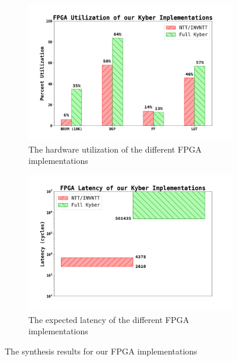 \begin{figure}[H]
  \centering
  \begin{subfigure}{.45\textwidth}
    \centering
    \includegraphics[width=\linewidth]{imgs/results-synth-util.png}
    \caption{The hardware utilization of the different FPGA implementations}
    \label{fig:results-synth-util}
  \end{subfigure}\hspace{0.05\textwidth}%
  \begin{subfigure}{.45\textwidth}
    \centering
    \includegraphics[width=\linewidth]{imgs/results-synth-lat.png}
    \caption{The expected latency of the different FPGA implementations}
    \label{fig:results-synth-lat}
  \end{subfigure}
  \caption{The synthesis results for our FPGA implementations}
\end{figure}

